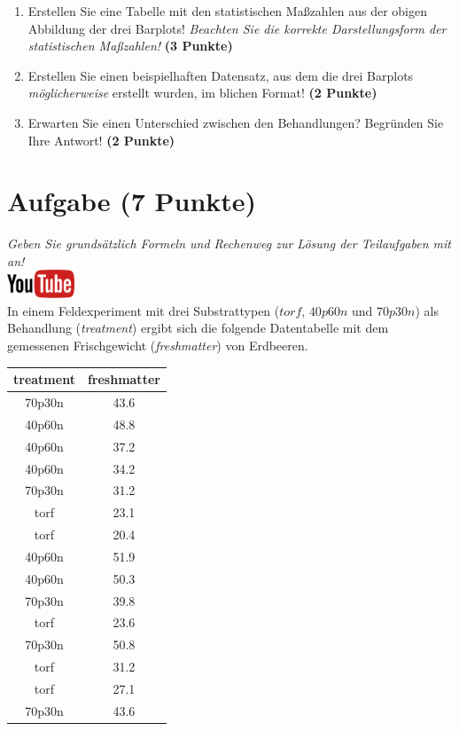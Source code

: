 \documentclass[a4paper, 9pt]{scrartcl}\usepackage[]{graphicx}\usepackage[]{xcolor}
\begin{document}
\begin{enumerate}
\item Erstellen Sie eine Tabelle mit den statistischen Ma{\ss}zahlen aus der
  obigen Abbildung der drei Barplots! \textit{Beachten Sie die korrekte
    Darstellungsform der statistischen Ma{\ss}zahlen!} \textbf{(3 Punkte)}
\item Erstellen Sie einen beispielhaften Datensatz, aus dem die drei
  Barplots \textit{m{\"o}glicherweise} erstellt wurden, im blichen Format! \textbf{(2 Punkte)}
\item Erwarten Sie einen Unterschied zwischen den Behandlungen? Begr{\"u}nden
  Sie Ihre Antwort! \textbf{(2 Punkte)}
\end{enumerate} 
\clearpage

\section{Aufgabe \hfill (7 Punkte)}

\textit{Geben Sie grunds{\"a}tzlich Formeln und Rechenweg zur L{\"o}sung der
  Teilaufgaben mit an!} \\[1Ex]

\hfill\href{https://youtu.be/vXnLttRL_VI}{\includegraphics[width =
  2cm]{img/youtube}}\\[1Ex]



In einem Feldexperiment mit drei Substrattypen ($torf$, $40p60n$ und $70p30n$) als Behandlung
(\textit{treatment}) ergibt sich die folgende Datentabelle mit dem
gemessenen Frischgewicht (\textit{freshmatter}) von Erdbeeren.

\begin{table}[!h]
\centering
\begin{tabular}{cc}
\toprule
treatment & freshmatter\\
\midrule
70p30n & 43.6\\
40p60n & 48.8\\
40p60n & 37.2\\
40p60n & 34.2\\
70p30n & 31.2\\
\addlinespace
torf & 23.1\\
torf & 20.4\\
40p60n & 51.9\\
40p60n & 50.3\\
70p30n & 39.8\\
\addlinespace
torf & 23.6\\
70p30n & 50.8\\
torf & 31.2\\
torf & 27.1\\
70p30n & 43.6\\
\bottomrule
\end{tabular}
\end{table}
\end{document}
